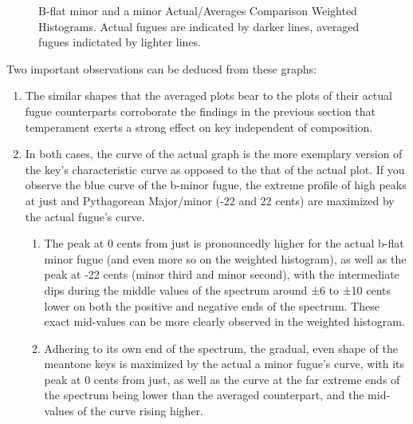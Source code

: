 \begin{figure}[H]
\vspace{1.5em}
    \centering
    \caption[B-flat minor and a minor Actual/Averages Comparison Weighted Histograms. ]{B-flat minor and a minor Actual/Averages Comparison Weighted Histograms. Actual fugues are indicated by darker lines, averaged fugues indictated by lighter lines.}
\end{figure}    Two important observations can be deduced from these graphs:

\begin{enumerate}
\def\labelenumi{\arabic{enumi}.}
\tightlist
\item
  The similar shapes that the averaged plots bear to the plots of their
  actual fugue counterparts corroborate the findings in the previous
  section that temperament exerts a strong effect on key independent of
  composition.
\item
  In both cases, the curve of the actual graph is the more exemplary
  version of the key's characteristic curve as opposed to the that of
  the actual plot. If you observe the blue curve of the b-minor fugue,
  the extreme profile of high peaks at just and Pythagorean Major/minor
  (-22 and 22 cents) are maximized by the actual fugue's curve.

  \begin{enumerate}
  \def\labelenumii{\arabic{enumii}.}
  \tightlist
  \item
    The peak at 0 cents from just is pronouncedly higher for the actual
    b-flat minor fugue (and even more so on the weighted histogram), as
    well as the peak at -22 cents (minor third and minor second), with
    the intermediate dips during the middle values of the spectrum
    around ±6 to ±10 cents lower on both the positive and negative ends
    of the spectrum. These exact mid-values can be more clearly observed
    in the weighted histogram.
  \item
    Adhering to its own end of the spectrum, the gradual, even shape of
    the meantone keys is maximized by the actual a minor fugue's curve,
    with its peak at 0 cents from just, as well as the curve at the far
    extreme ends of the spectrum being lower than the averaged
    counterpart, and the mid-values of the curve rising higher.
  \end{enumerate}
\end{enumerate}

